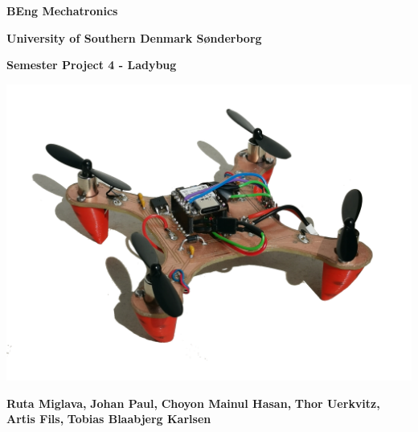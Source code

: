 \documentclass[a4paper,12pt]{article}
\begin{document}
\begin{titlepage}



\begin{center}


\noindent \textbf{BEng Mechatronics}

\noindent \textbf{University of Southern Denmark Sønderborg}

\Huge \bfseries{Semester Project 4 - Ladybug}

\end{center}

\begin{center}


\vspace*{0.1cm}


	\includegraphics[width = 10 cm]{pictures/FPP.png}

	\noindent \textbf{Ruta Miglava, }
	\noindent \textbf{Johan Paul, }
	\noindent \textbf{Choyon Mainul Hasan, }
	\noindent \textbf{Thor Uerkvitz, }
	\noindent \textbf{Artis Fils, }
	\noindent \textbf{Tobias Blaabjerg Karlsen}

	\vspace*{2cm}




\end{center}
\end{titlepage}
\end{document}
